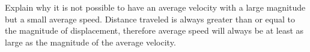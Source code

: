 {Explain why it is not possible to have an average velocity with a large magnitude but a small average speed.
}
{
Distance traveled is always greater than or equal to the magnitude of displacement, therefore average speed will always be at least as large as the magnitude of the average velocity.}
